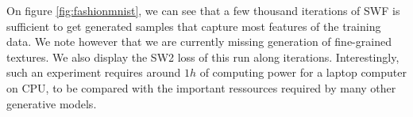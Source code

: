 On figure \ref{fig:fashionmnist}, we can see that a few thousand iterations of SWF is sufficient to get generated samples that capture most features of the training data. We note however that we are currently missing generation of fine-grained textures. We also display the SW2 loss of this run along iterations. Interestingly, such an experiment requires around $1h$ of computing power for a laptop computer on CPU, to be compared with the important ressources required by many other generative models.













